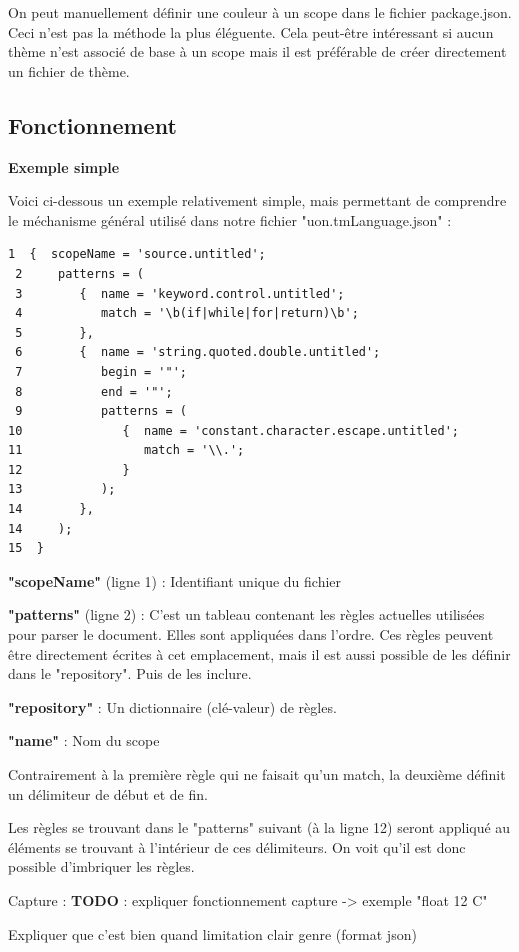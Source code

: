 \documentclass[
    iict, %
    il, %
]{heig-tb}
\begin{document}
On peut manuellement définir une couleur à un scope dans le fichier package.json. Ceci n'est pas la méthode la plus éléguente.
Cela peut-être intéressant si aucun thème n'est associé de base à un scope mais il est préférable de créer directement un fichier de thème.


\subsection{Fonctionnement}
\textbf{Exemple simple}

Voici ci-dessous un exemple relativement simple, mais permettant de comprendre le méchanisme général utilisé dans notre fichier "uon.tmLanguage.json" :
\begin{lstlisting}[frame=single, caption={Textmate grammar},label={Textmate grammar}]
 1  {  scopeName = 'source.untitled';
 2     patterns = (
 3        {  name = 'keyword.control.untitled';
 4           match = '\b(if|while|for|return)\b';
 5        },
 6        {  name = 'string.quoted.double.untitled';
 7           begin = '"';
 8           end = '"';
 9           patterns = (
10              {  name = 'constant.character.escape.untitled';
11                 match = '\\.';
12              }
13           );
14        },
14     );
15  }
\end{lstlisting}
\textbf{"scopeName"} (ligne 1) : Identifiant unique du fichier

\textbf{"patterns"} (ligne 2) : C'est un tableau contenant les règles actuelles utilisées pour parser le document. Elles sont appliquées dans l'ordre.
Ces règles peuvent être directement écrites à cet emplacement, mais il est aussi possible de les définir dans le "repository". Puis de les inclure.

\textbf{"repository"} : Un dictionnaire (clé-valeur) de règles.

\textbf{"name"} : Nom du scope

Contrairement à la première règle qui ne faisait qu'un match, la deuxième définit un délimiteur de début et de fin.

Les règles se trouvant dans le "patterns" suivant (à la ligne 12) seront appliqué au éléments se trouvant à l'intérieur de ces délimiteurs. On voit qu'il est donc possible d'imbriquer les règles.

Capture : \textbf{TODO} : expliquer fonctionnement capture -> exemple "float 12 C"

Expliquer que c'est bien quand limitation clair genre {} (format json)
\end{document}
